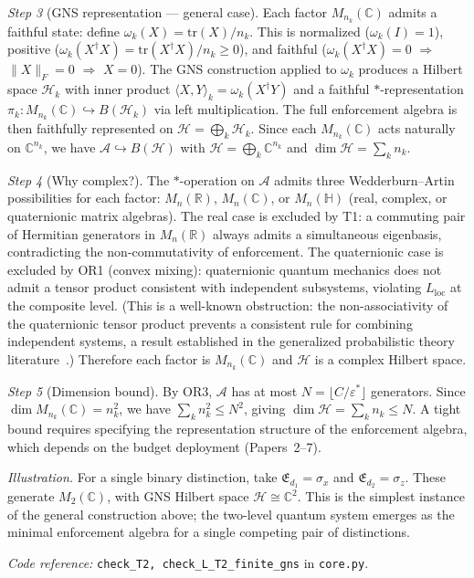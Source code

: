 \documentclass[11pt]{article}
\newcommand{\coderef}[2]{\smallskip\noindent\textit{Code reference:} \texttt{#1} in \texttt{#2}.}
\begin{document}
\begin{tcolorbox}[apfbox, title={T2: Noncommutativity $\to$ Operator Algebra on Hilbert Space}]
\textit{Step 3} (GNS representation --- general case).  Each factor $M_{n_k}(\mathbb{C})$ admits a faithful state: define $\omega_k(X) = \mathrm{tr}(X)/n_k$.  This is normalized ($\omega_k(I) = 1$), positive ($\omega_k(X^\dagger X) = \mathrm{tr}(X^\dagger X)/n_k \ge 0$), and faithful ($\omega_k(X^\dagger X) = 0$ $\Rightarrow$ $\|X\|_F = 0$ $\Rightarrow$ $X = 0$).  The GNS construction applied to $\omega_k$ produces a Hilbert space $\mathcal{H}_k$ with inner product $\langle X, Y \rangle_k = \omega_k(X^\dagger Y)$ and a faithful $*$-representation $\pi_k: M_{n_k}(\mathbb{C}) \hookrightarrow B(\mathcal{H}_k)$ via left multiplication.  The full enforcement algebra is then faithfully represented on $\mathcal{H} = \bigoplus_k \mathcal{H}_k$.  Since each $M_{n_k}(\mathbb{C})$ acts naturally on $\mathbb{C}^{n_k}$, we have $\mathcal{A} \hookrightarrow B(\mathcal{H})$ with $\mathcal{H} = \bigoplus_k \mathbb{C}^{n_k}$ and $\dim \mathcal{H} = \sum_k n_k$.

\textit{Step 4} (Why complex?).  The $*$-operation on $\mathcal{A}$ admits three Wedderburn--Artin possibilities for each factor: $M_n(\mathbb{R})$, $M_n(\mathbb{C})$, or $M_n(\mathbb{H})$ (real, complex, or quaternionic matrix algebras).  The real case is excluded by T1: a commuting pair of Hermitian generators in $M_n(\mathbb{R})$ always admits a simultaneous eigenbasis, contradicting the non-commutativity of enforcement.  The quaternionic case is excluded by OR1 (convex mixing): quaternionic quantum mechanics does not admit a tensor product consistent with independent subsystems, violating $L_{\mathrm{loc}}$ at the composite level.  (This is a well-known obstruction: the non-associativity of the quaternionic tensor product prevents a consistent rule for combining independent systems, a result established in the generalized probabilistic theory literature~\cite{Hardy2001}.)  Therefore each factor is $M_{n_k}(\mathbb{C})$ and $\mathcal{H}$ is a complex Hilbert space.

\textit{Step 5} (Dimension bound).  By OR3, $\mathcal{A}$ has at most $N = \lfloor C/\varepsilon^* \rfloor$ generators.  Since $\dim M_{n_k}(\mathbb{C}) = n_k^2$, we have $\sum_k n_k^2 \le N^2$, giving $\dim \mathcal{H} = \sum_k n_k \le N$.  A tight bound requires specifying the representation structure of the enforcement algebra, which depends on the budget deployment (Papers~2--7).

\textit{Illustration.}  For a single binary distinction, take $\mathfrak{E}_{d_1} = \sigma_x$ and $\mathfrak{E}_{d_2} = \sigma_z$.  These generate $M_2(\mathbb{C})$, with GNS Hilbert space $\mathcal{H} \cong \mathbb{C}^2$.  This is the simplest instance of the general construction above; the two-level quantum system emerges as the minimal enforcement algebra for a single competing pair of distinctions.

\coderef{check\_T2, check\_L\_T2\_finite\_gns}{core.py}
\end{tcolorbox}
\end{document}
